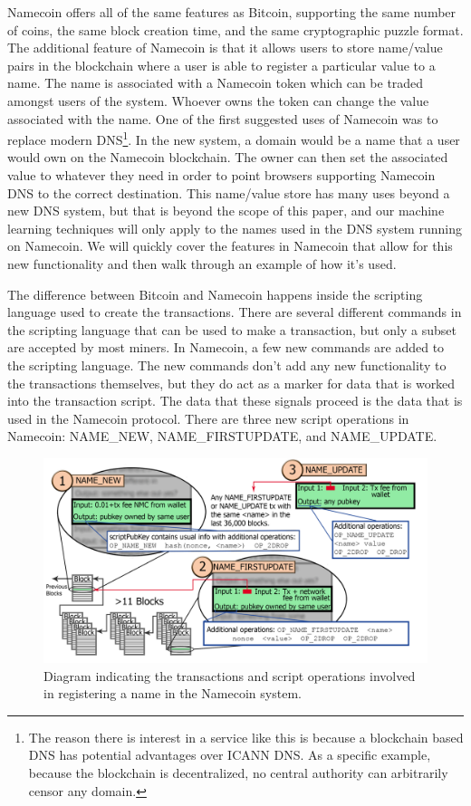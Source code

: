 \documentclass{article} %
\begin{document}
    Namecoin offers all of the same features as Bitcoin, supporting the same number of coins, the same block creation time, and the same cryptographic puzzle format. The additional feature of Namecoin is that it allows users to store name/value pairs in the blockchain where a user is able to register a particular value to a name. The name is associated with a Namecoin token which can be traded amongst users of the system. Whoever owns the token can change the value associated with the name. One of the first suggested uses of Namecoin was to replace modern DNS\footnote{The reason there is interest in a service like this is because a blockchain based DNS has potential advantages over ICANN DNS. As a specific example, because the blockchain is decentralized, no central authority can arbitrarily censor any domain.}. In the new system, a domain would be a name that a user would own on the Namecoin blockchain. The owner can then set the associated value to whatever they need in order to point browsers supporting Namecoin DNS to the correct destination. This name/value store has many uses beyond a new DNS system, but that is beyond the scope of this paper, and our machine learning techniques will only apply to the names used in the DNS system running on Namecoin. We will quickly cover the features in Namecoin that allow for this new functionality and then walk through an example of how it's used. 

    The difference between Bitcoin and Namecoin happens inside the scripting language used to create the transactions. There are several different commands in the scripting language that can be used to make a transaction, but only a subset are accepted by most miners. In Namecoin, a few new commands are added to the scripting language. The new commands don't add any new functionality to the transactions themselves, but they do act as a marker for data that is worked into the transaction script. The data that these signals proceed is the data that is used in the Namecoin protocol. There are three new script operations in Namecoin: NAME\_NEW, NAME\_FIRSTUPDATE, and NAME\_UPDATE. 

\begin{figure}
\begin{centering}
\includegraphics[scale=0.8]{registration}
\par\end{centering}
\protect\caption{Diagram indicating the transactions and script operations involved in registering a name in the Namecoin system. \label{fig:registration}}
\end{figure}
\end{document}
